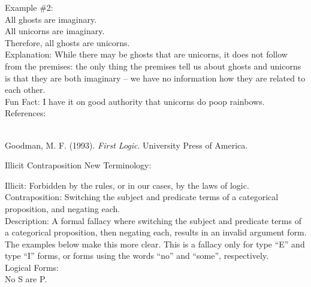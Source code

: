 \documentclass[a4paper,12pt,single,pdftex]{scrartcl}
\begin{document}
    
      Example \#2:
    \\

    
      All ghosts are imaginary.
    \\

    
      All unicorns are imaginary.
    \\

    
      Therefore, all ghosts are unicorns.
    \\

    
      Explanation: While there may be ghosts that are unicorns, it does not follow from the premises: the only thing the premises tell us about ghosts and unicorns is that they are both imaginary -- we have no information how they are related to each other.
    \\

    
      Fun Fact: I have it on good authority that unicorns do poop rainbows.
    \\

    References:

    
      
        
      \\

      
        
          Goodman, M. F. (1993). {\it First Logic}. University Press of America.
        
      
    
  

Illicit Contraposition
    New Terminology:

    
      Illicit: Forbidden by the rules, or in our cases, by the laws of logic.
    \\

    
      Contraposition: Switching the subject and predicate terms of a categorical proposition, and negating each.
    \\

    
      Description: A formal fallacy where switching the subject and predicate terms of a categorical proposition, then negating each, results in an invalid argument form.  The examples below make this more clear.  This is a fallacy only for type “E” and type “I” forms, or forms using the words “no” and “some”, respectively.
    \\

    
      Logical Forms:
    \\

    
      No S are P.
    \\
\end{document}
